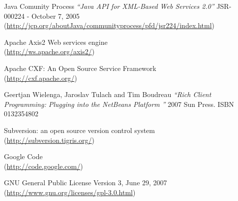 \begin{thebibliography}{99}
 Java Comunity Process \emph{``Java API for XML-Based Web
Services 2.0''} JSR-000224 - October 7, 2005\\
(\href{http://jcp.org/aboutJava/communityprocess/pfd/jsr224/index.html}{http://jcp.org/aboutJava/communityprocess/pfd/jsr224/index.html})

 Apache Axis2 Web services engine \\
(\href{http://ws.apache.org/axis2/}{http://ws.apache.org/axis2/})

 Apache CXF: An Open Source Service Framework \\
(\href{http://cxf.apache.org/}{http://cxf.apache.org/})

 Geertjan Wielenga, Jaroslav Tulach and Tim Boudreau
\emph{``Rich Client Programming: Plugging into the NetBeans Platform ''} 2007
Sun Press. ISBN 0132354802

 Subversion: an open source version control system \\
(\href{http://subversion.tigris.org/}{http://subversion.tigris.org/})

 Google Code \\
(\href{http://code.google.com/}{http://code.google.com/})

 GNU General Public License Version 3, June 29, 2007\\ 
(\href{http://www.gnu.org/licenses/gpl-3.0.html}{http://www.gnu.org/licenses/gpl-3.0.html})

\end{thebibliography} 